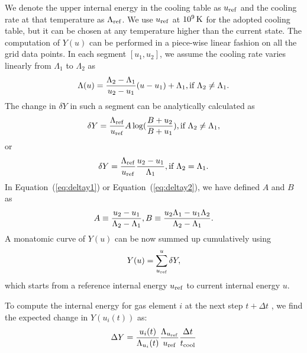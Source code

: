 \documentclass[a4paper,fleqn,usenatbib,useAMS, twocolumn]{mnras}
\begin{document}
We denote the upper internal energy in the cooling table as $u_{\rm
  ref}$ and the cooling rate at that temperature as $\Lambda_{\rm
  ref}$. We use $u_{\rm ref}$ at $10^9\, \rm{K}$ for the adopted
cooling table, but it can be chosen at any temperature
higher than the current state. The computation of $Y(u)$ can be
performed in a piece-wise linear fashion on all the grid data
points. In each segment $[u_1, u_2]$, we assume the cooling rate
varies linearly from $\Lambda_1$ to $\Lambda_2$ as
\begin{equation}
\\
\Lambda(u) = \frac{\Lambda_2 - \Lambda_1}{u_2 - u_1}(u - u_1) + \Lambda_1, \text{if} \ \Lambda_2 \ne \Lambda_1.
\end{equation}
The change in
$\delta Y$ in such a segment can be analytically calculated as
\begin{equation}
\\
\delta Y = \frac{\Lambda_{\rm ref}}{u_{\rm ref}} A \log (\frac{B+u_2}{B+u_1}), \text{if} \ \Lambda_2 \ne \Lambda_1, 
\label{eq:deltay1}
\end{equation}
or 
\begin{equation}
\\
\delta Y = \frac{\Lambda_{\rm ref}}{u_{\rm ref}} \frac{u_2-u_1}{\Lambda_1}, \text{if} \ \Lambda_2 = \Lambda_1.
\label{eq:deltay2}
\end{equation}
In Equation~(\ref{eq:deltay1}) or Equation~(\ref{eq:deltay2}), we have defined $A$ and $B$ as 
\begin{equation}
\\ A \equiv  \frac{u_2 - u_1}{\Lambda_2 - \Lambda_1}, \\
B \equiv \frac{u_2\Lambda_1 - u_1\Lambda_2}{\Lambda_2 - \Lambda_1}.
\end{equation}
A monatomic curve of $Y(u)$ can be now summed up cumulatively using 
\begin{equation}
\\ Y(u) = \sum^{u}_{u_{\rm ref}}\delta Y, 
\label{eq:y}
\end{equation}
which starts from a reference internal energy $u_{\rm ref}$ to current internal energy $u$. 

To compute the internal energy for gas element $i$ at the next step $t+\Delta t$ , we find the expected change in $Y(u_i(t))$ as: 
\begin{equation}
\\
\Delta Y =	\frac{u_{i}(t)} {\Lambda_{u_{i}}(t)}\frac{\Lambda_{u_{\rm ref}}}{u_{\rm ref}}\frac{\Delta t}{t_{\rm cool}}
\label{eq:deltay3}
\end{equation}
\end{document}
